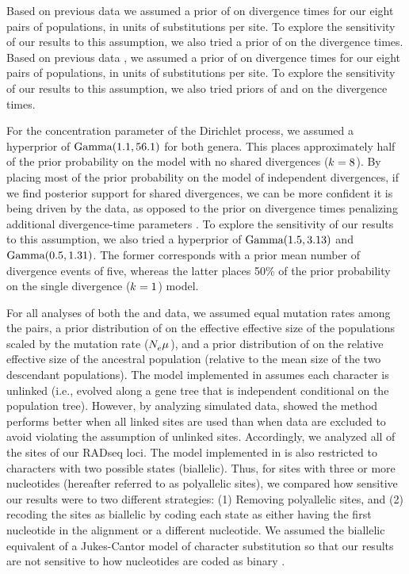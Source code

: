 Based on previous data \citep{Welton2010, Welton2010zootaxa, Siler2010} we
assumed a prior of  on divergence times for our eight pairs
of  populations, in units of substitutions per site.
To explore the sensitivity of our results to this assumption, we also
tried a prior of  on the divergence times.
Based on previous data \citep{Siler2012, Siler2014kikuchii}, we assumed a prior
of  on divergence times for our eight pairs of 
populations, in units of substitutions per site.
To explore the sensitivity of our results to this assumption, we also tried
priors of  and  on the 
divergence times.

For the concentration parameter of the Dirichlet process, we assumed
a hyperprior of $\textrm{Gamma}(1.1, 56.1)$ for both genera.
This places approximately half of the prior probability on the model
with no shared divergences ($k_{} = 8$).
By placing most of the prior probability on the model of independent
divergences, if we find posterior support for shared divergences, we can be
more confident it is being driven by the data,
as opposed to the prior on divergence times penalizing additional
divergence-time parameters
\citep{Jeffreys1939,Lindley1957,Oaks2012,Oaks2014reply}.
To explore the sensitivity of our results to this assumption, we also
tried a hyperprior of
$\textrm{Gamma}(1.5, 3.13)$
and
$\textrm{Gamma}(0.5, 1.31)$.
The former corresponds with a prior mean number of divergence events of five,
whereas the latter places 50\% of the prior probability on the single
divergence ($k_{} = 1$) model.

For all analyses of both the  and  data, we
assumed equal mutation rates among the pairs, a prior distribution of
 on the effective effective size of the populations scaled
by the mutation rate ($N_{e}^{}{}\mu_{}{}$), and a
prior distribution of  on the relative effective size of the
ancestral population (relative to the mean size of the two descendant
populations).
The model implemented in \ecoevolity assumes each character is unlinked (i.e.,
evolved along a gene tree that is independent conditional on the population
tree).
However, by analyzing simulated data, \citet{Oaks2018ecoevolity} showed
the method performs better when all linked sites are used than when data are
excluded to avoid violating the assumption of unlinked sites.
Accordingly, we analyzed all of the sites of our RADseq loci.
The model implemented in \ecoevolity is also restricted to characters with two
possible states (biallelic).
Thus, for sites with three or more nucleotides (hereafter referred to as
polyallelic sites), we compared how sensitive our
results were to two different strategies:
(1) Removing polyallelic sites, and
(2) recoding the sites as biallelic by coding each state as either having the
first nucleotide in the alignment or a different nucleotide.
We assumed the biallelic equivalent of a Jukes-Cantor model of character
substitution \citep{JC1969} so that our results are not sensitive to how
nucleotides are coded as binary
\citep{Oaks2018ecoevolity}.

